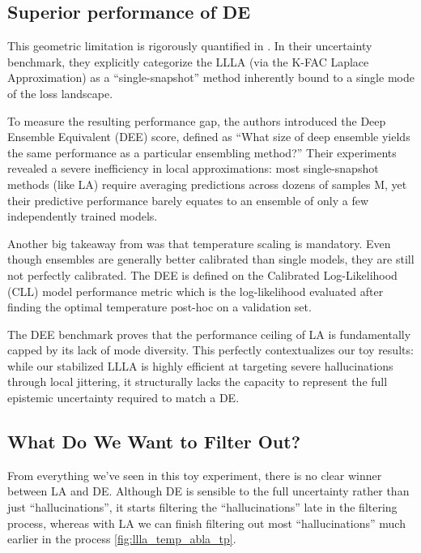 \subsection{Superior performance of \acs{DE}}
This geometric limitation is rigorously quantified in  \cite{ashukha_pitfalls_2021}. In their uncertainty benchmark, they explicitly categorize the \acs{LLLA} (via the K-FAC Laplace Approximation) as a ``single-snapshot'' method inherently bound to a single mode of the loss landscape.

To measure the resulting performance gap, the authors introduced the Deep Ensemble Equivalent (\acs{DEE}) score, defined as ``What size of deep ensemble yields the same performance as a particular ensembling method?'' Their experiments revealed a severe inefficiency in local approximations: most single-snapshot methods (like \acs{LA}) require averaging predictions across dozens of samples $\mathrm{M}$, yet their predictive performance barely equates to an ensemble of only a few independently trained models.

Another big takeaway from \cite{ashukha_pitfalls_2021} was that temperature scaling is mandatory. Even though ensembles are generally better calibrated than single models, they are still not perfectly calibrated.
The \acs{DEE} is defined on the Calibrated Log-Likelihood (\acs{CLL}) model performance metric which is the log-likelihood evaluated after finding the optimal temperature post-hoc on a validation set.

The \acs{DEE} benchmark proves that the performance ceiling of \acs{LA} is fundamentally capped by its lack of mode diversity. This perfectly contextualizes our toy results: while our stabilized \acs{LLLA} is highly efficient at targeting severe hallucinations through local jittering, it structurally lacks the capacity to represent the full epistemic uncertainty required to match a \acs{DE}.

\subsection{What Do We Want to Filter Out?}

From everything we've seen in this toy experiment, there is no clear winner between \acs{LA} and \acs{DE}. Although \acs{DE} is sensible to the full uncertainty rather than just ``hallucinations'', it starts filtering the ``hallucinations'' late in the filtering process, whereas with \acs{LA} we can finish filtering out most ``hallucinations'' much earlier in the process \autoref{fig:llla_temp_abla_tp}. 

